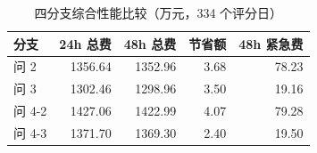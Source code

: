 \begin{table}[H]\centering
\caption{四分支综合性能比较（万元，334 个评分日）}\label{tab:main-results}
\small\renewcommand{\arraystretch}{1.12}\setlength{\tabcolsep}{4pt}
\begin{tabularx}{\textwidth}{@{}LRRRR@{}}
\toprule
{} 分支 & 24h 总费 & 48h 总费 & 节省额 & 48h 紧急费 \\
\midrule
问 2 & 1356.64 & 1352.96 & 3.68 & 78.23 \\
问 3 & 1302.46 & 1298.96 & 3.50 & 19.16 \\
问 4-2 & 1427.06 & 1422.99 & 4.07 & 79.28 \\
问 4-3 & 1371.70 & 1369.30 & 2.40 & 19.50 \\
\bottomrule
\end{tabularx}
\par\vspace{3pt}{\footnotesize 24h 为单日时域配置，48h 为跨日前瞻配置；节省额为两者总费之差。}
\end{table}
